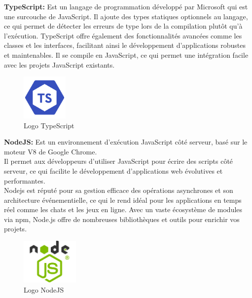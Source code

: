  {\bf{ TypeScript:}}
Est un langage de programmation développé par Microsoft qui est une surcouche de JavaScript. Il ajoute des types statiques optionnels au langage, ce qui permet de détecter les erreurs de type lors de la compilation plutôt qu'à l'exécution. TypeScript offre également des fonctionnalités avancées comme les classes et les interfaces, facilitant ainsi le développement d'applications robustes et maintenables. Il se compile en JavaScript, ce qui permet une intégration facile avec les projets JavaScript existants.
 \begin{figure}[H]%
    \center%
    \includegraphics[width=0.2\textwidth]{pages/images/typescript.png}
    \caption{ Logo TypeScript }\label{fig:test}%
  \end{figure}






 {\bf{ NodeJS:}}
 Est un environnement d'exécution JavaScript côté serveur, basé sur le moteur V8 de Google Chrome. 
\\
Il permet aux développeurs d'utiliser JavaScript pour écrire des scripts côté serveur, ce qui facilite le développement d'applications web évolutives et performantes. 
\\
Nodejs est réputé pour sa gestion efficace des opérations asynchrones et son architecture événementielle, ce qui le rend idéal pour les applications en temps réel comme les chats et les jeux en ligne. Avec un vaste écosystème de modules via npm, Node.js offre de nombreuses bibliothèques et outils pour enrichir vos projets.
 \begin{figure}[H]%
    \center%
    \includegraphics[width=0.25\textwidth]{pages/images/nodejs.png}
    \caption{Logo NodeJS}\label{fig:test}%
  \end{figure}

